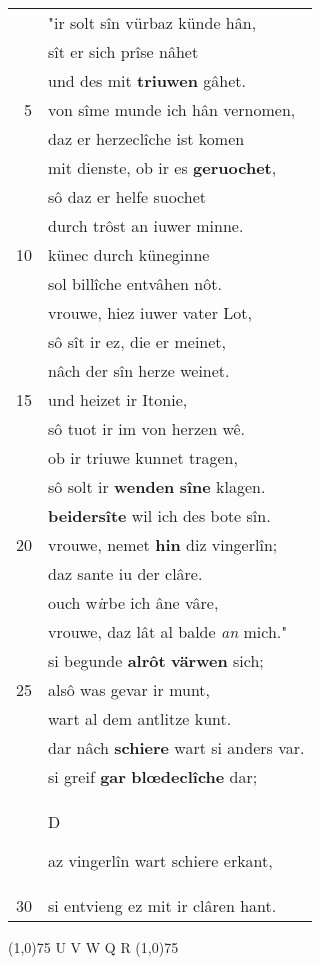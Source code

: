 \documentclass[8pt,a4paper,notitlepage]{article}
\begin{document}
\begin{table}[ht]
\begin{minipage}[t]{0.5\linewidth}
\begin{tabular}{rl}
 & "ir solt sîn vürbaz künde hân,\\ 
 & sît er sich prîse nâhet\\ 
 & und des mit \textbf{triuwen} gâhet.\\ 
5 & von sîme munde ich hân vernomen,\\ 
 & daz er herzeclîche ist komen\\ 
 & mit dienste, ob ir es \textbf{geruochet},\\ 
 & sô daz er helfe suochet\\ 
 & durch trôst an iuwer minne.\\ 
10 & künec durch küneginne\\ 
 & sol billîche entvâhen nôt.\\ 
 & vrouwe, hiez iuwer vater Lot,\\ 
 & sô sît ir ez, die er meinet,\\ 
 & nâch der sîn herze weinet.\\ 
15 & und heizet ir Itonie,\\ 
 & sô tuot ir im von herzen wê.\\ 
 & ob ir triuwe kunnet tragen,\\ 
 & sô solt ir \textbf{wenden} \textbf{sîne} klagen.\\ 
 & \textbf{beidersîte} wil ich des bote sîn.\\ 
20 & vrouwe, nemet \textbf{hin} diz vingerlîn;\\ 
 & daz sante iu der clâre.\\ 
 & ouch w\textit{i}rbe ich âne vâre,\\ 
 & vrouwe, daz lât al balde \textit{an} mich."\\ 
 & si begunde \textbf{alrôt} \textbf{värwen} sich;\\ 
25 & alsô was gevar ir munt,\\ 
 & wart al dem antlitze kunt.\\ 
 & dar nâch \textbf{schiere} wart si anders var.\\ 
 & si greif \textbf{gar} \textbf{blœdeclîche} dar;\\ 
 & \begin{large}D\end{large}az vingerlîn wart schiere erkant,\\ 
30 & si entvieng ez mit ir clâren hant.\\ 
\end{tabular}
\scriptsize
\line(1,0){75} \newline
U V W Q R \newline
\line(1,0){75} \newline

\end{minipage}
\end{table}
\end{document}

